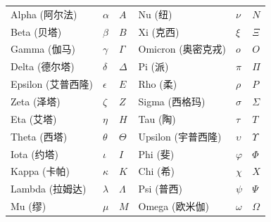 \documentclass[../../../include/open-logic-chapter]{subfiles}
\begin{document}

\begin{center}
    \begin{tabular}{lll@{\qquad}lll}
    Alpha (阿尔法) &	$\alpha$ & $A$ &
    Nu (纽) & $\nu$ & $N$ \\
    Beta (贝塔) & $\beta$ & $B$ &
    Xi (克西) & $\xi$ & $\Xi$ \\
    Gamma (伽马) &	$\gamma$ & $\Gamma$ &
    Omicron (奥密克戎) & $o$ & $O$ \\
    Delta (德尔塔) & $\delta$ & $\Delta$ &
    Pi (派) & $\pi$ & $\Pi$ \\
    Epsilon (艾普西隆) & $\epsilon$ & $E$ &
    Rho (柔) & $\rho$ & $P$ \\
    Zeta (泽塔) & $\zeta$ & $Z$ &
    Sigma (西格玛) &	$\sigma$ & $\Sigma$ \\
    Eta (艾塔) & $\eta$ & $H$ &
    Tau (陶) & $\tau$ & $T$ \\
    Theta (西塔) & $\theta$ & $\Theta$ &
    Upsilon (宇普西隆) & $\upsilon$ & $\Upsilon$ \\
    Iota (约塔) & $\iota$ & $I$ &
    Phi (斐) & $\varphi$ & $\Phi$ \\
    Kappa (卡帕) & $\kappa$ & $K$ &
    Chi (希) & $\chi$ & $X$ \\
    Lambda (拉姆达) & $\lambda$ & $\Lambda$ &
    Psi (普西) & $\psi$ & $\Psi$ \\
    Mu (缪) & $\mu$ & $M$ &
    Omega (欧米伽) & $\omega$ & $\Omega$
    \end{tabular}
\end{center}
\end{document}
